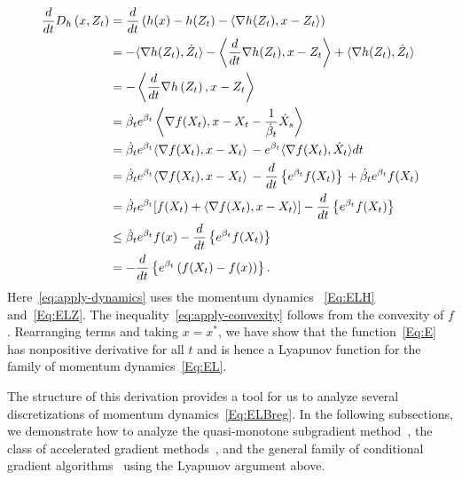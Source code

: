 \documentclass[11pt]{article}
\theoremstyle{plain}
\begin{document}
\begin{subequations}\label{Eq:LyapAnal}
\begin{align}
 \frac{d}{dt}D_h\left(x, Z_t\right)  &= \frac{d}{dt}\left( h(x) - h(Z_t) - \langle \nabla h(Z_t), x- Z_t\rangle\right)  \notag\\
& = - \langle \nabla h(Z_t), \dot Z_t\rangle -\left\langle \frac{d}{dt} \nabla h(Z_t),x - Z_t\right\rangle  + \langle \nabla h(Z_t), \dot Z_t\rangle \notag\\ 
 &= -\left\langle \frac{d}{dt} \nabla h\left(Z_t\right), x - Z_t\right\rangle \, \notag\\%
&=   \dot \beta_t e^{\beta_t}\left\langle\nabla f(X_t), x  - X_{t} - \frac{1}{\dot \beta_t} \dot X_{s} \right\rangle  \, \label{eq:apply-dynamics}   \\
& =   \dot \beta_t e^{\beta_t} \langle \nabla f(X_t), x - X_t \rangle\, - e^{ \beta_t} \langle \nabla f(X_t), \dot X_t\rangle dt\, \notag   \\
& = \dot \beta_t e^{\beta_t} \langle \nabla f(X_t), x - X_t \rangle\,  -   \frac{d}{dt}\left\{e^{ \beta_t} f(X_t)\right\}\,   + \dot \beta_t e^{\beta_t}  f(X_t)  \notag\\
&= \dot \beta_t e^{\beta_t} [f(X_t)+ \langle \nabla f(X_t), x - X_t \rangle] -\frac{d}{dt}\left\{e^{ \beta_t} f(X_t)\right\}\,  \notag  \\ %
& \leq  \dot \beta_t e^{\beta_t}f(x) - \frac{d}{dt}\left\{e^{ \beta_t} f(X_t)\right\}\, \label{eq:apply-convexity}\\
& = - \frac{d}{dt} \left\{e^{\beta_t}\left(f(X_t) - f(x)\right)\right\} \label{Eq:cond1}.
\end{align}
\end{subequations}
Here~\eqref{eq:apply-dynamics} uses the momentum dynamics%
~\eqref{Eq:ELH} and~\eqref{Eq:ELZ}. 
The inequality~\eqref{eq:apply-convexity} follows from the convexity of $f$. Rearranging terms and taking $x = x^\ast$, we have show that the function~\eqref{Eq:E} has nonpositive derivative for all $t$ and is hence a Lyapunov function for the family of momentum dynamics~\eqref{Eq:EL}.

 The structure of this derivation provides a tool for us to analyze several discretizations of momentum dynamics~\eqref{Eq:ELBreg}.
 In the following subsections, we demonstrate how to analyze the quasi-monotone subgradient method~\cite{Nesterov15}, the class of accelerated gradient methods~\cite{Baes09,Acceleration}, and the general family of conditional gradient algorithms~\cite{NesterovCond15} using the Lyapunov argument above.
\end{document}
